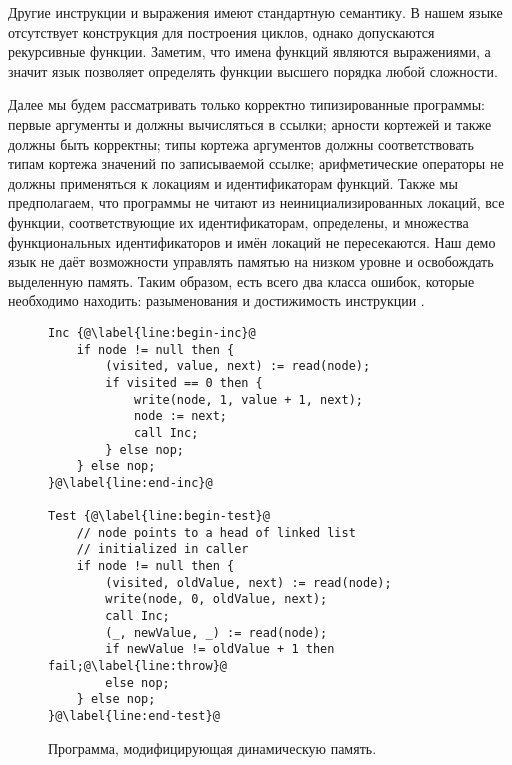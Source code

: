 
Другие инструкции и выражения имеют стандартную семантику. В нашем языке отсутствует конструкция для построения циклов, однако допускаются рекурсивные функции. Заметим, что имена функций являются выражениями, а значит язык позволяет определять функции высшего порядка любой сложности.

Далее мы будем рассматривать только корректно типизированные программы: первые аргументы \kwdread{} и \kwdwrite{} должны вычисляться в ссылки; арности кортежей \kwdread{} и \kwdwrite{} также должны быть корректны; типы кортежа аргументов \kwdwrite{} должны соответствовать типам кортежа значений по записываемой ссылке; арифметические операторы не должны применяться к локациям и идентификаторам функций. Также мы предполагаем, что программы не читают из неинициализированных локаций, все функции, соответствующие их идентификаторам, определены, и множества функциональных идентификаторов и имён локаций не пересекаются. Наш демо язык не даёт возможности управлять памятью на низком уровне и освобождать выделенную память. Таким образом, есть всего два класса ошибок, которые необходимо находить: разыменования  и достижимость инструкции \kwdfail{}.


\begin{figure}
\begin{lstlisting}[style=demolang]
Inc {@\label{line:begin-inc}@
	if node != null then {
		(visited, value, next) := read(node);
		if visited == 0 then {
			write(node, 1, value + 1, next);
			node := next;
			call Inc;
		} else nop;
	} else nop;
}@\label{line:end-inc}@

Test {@\label{line:begin-test}@
	// node points to a head of linked list
	// initialized in caller
	if node != null then {
		(visited, oldValue, next) := read(node);
		write(node, 0, oldValue, next);
		call Inc;
		(_, newValue, _) := read(node);
		if newValue != oldValue + 1 then fail;@\label{line:throw}@
		else nop;
	} else nop;
}@\label{line:end-test}@
\end{lstlisting}
\caption{Программа, модифицирующая динамическую память.}
\label{figure:prog}
\end{figure}

